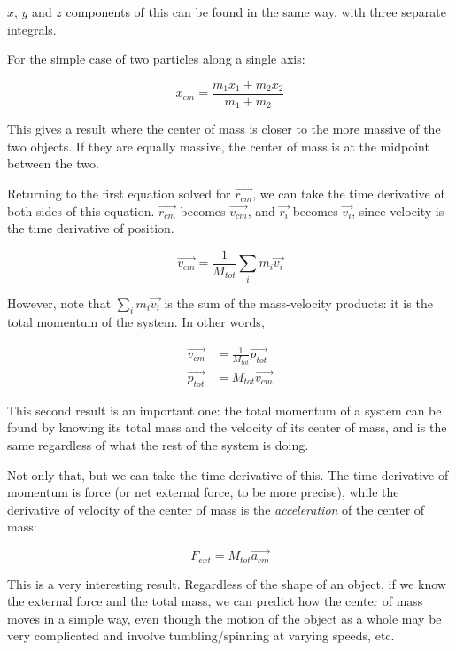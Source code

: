 $x$, $y$ and $z$ components of this can be found in the same way, with three separate integrals.

For the simple case of two particles along a single axis:

\begin{equation}
x_{cm} = \frac{m_1 x_1 + m_2 x_2}{m_1 + m_2}
\end{equation}

This gives a result where the center of mass is closer to the more massive of the two objects. If they are equally massive, the center of mass is at the midpoint between the two.

Returning to the first equation solved for $\vec{r_{cm}}$, we can take the time derivative of both sides of this equation. $\vec{r_{cm}}$ becomes $\vec{v_{cm}}$, and $\vec{r_i}$ becomes $\vec{v_i}$, since velocity is the time derivative of position.

\begin{equation}
\vec{v_{cm}} = \frac{1}{M_{tot}} \sum_i m_i \vec{v_i}
\end{equation}

However, note that $\sum_i m_i \vec{v_i}$ is the sum of the mass-velocity products: it is the total momentum of the system. In other words,

\begin{align}
\vec{v_{cm}} &= \frac{1}{M_{tot}} \vec{p_{tot}}\\
\vec{p_{tot}} &= M_{tot} \vec{v_{cm}}
\end{align}

This second result is an important one: the total momentum of a system can be found by knowing its total mass and the velocity of its center of mass, and is the same regardless of what the rest of the system is doing.

Not only that, but we can take the time derivative of this. The time derivative of momentum is force (or net external force, to be more precise), while the derivative of velocity of the center of mass is the \emph{acceleration} of the center of mass:

\begin{equation}
F_{ext} = M_{tot} \vec{a_{cm}}
\end{equation}

This is a very interesting result. Regardless of the shape of an object, if we know the external force and the total mass, we can predict how the center of mass moves in a simple way, even though the motion of the object as a whole may be very complicated and involve tumbling/spinning at varying speeds, etc.

